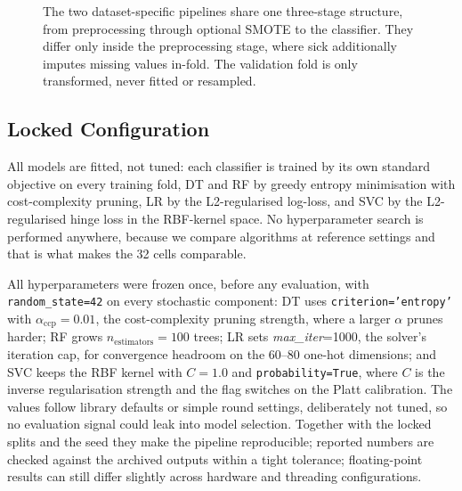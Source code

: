 \begin{figure}[H]
\caption{The two dataset-specific pipelines share one three-stage
structure, from preprocessing through optional SMOTE to the
classifier. They differ only inside the preprocessing stage, where
sick additionally imputes missing values in-fold. The validation fold
is only transformed, never fitted or resampled.}
\label{fig:pipelines}
\end{figure}

\subsection{Locked Configuration}
All models are fitted, not tuned: each classifier is trained by its
own standard objective on every training fold, DT and RF by greedy
entropy minimisation with cost-complexity pruning, LR by the
L2-regularised log-loss, and SVC by the L2-regularised hinge loss in
the RBF-kernel space. No hyperparameter search is performed anywhere,
because we compare algorithms at reference settings and that is what
makes the 32 cells comparable.

All hyperparameters were frozen once, before any evaluation, with
\texttt{random\_state=42} on every stochastic component:
DT uses \texttt{criterion='entropy'} with $\alpha_{\text{ccp}}=0.01$,
the cost-complexity pruning strength, where a larger $\alpha$ prunes
harder; RF grows $n_{\text{estimators}}=100$ trees; LR sets
\textit{max\_iter}=1000, the solver's iteration cap, for convergence
headroom on the 60--80 one-hot dimensions; and SVC keeps the RBF
kernel with $C=1.0$ and \texttt{probability=True}, where $C$ is the
inverse regularisation strength and the flag switches on the Platt
calibration.
The values follow library defaults or simple round settings,
deliberately not tuned, so no evaluation signal could leak into model
selection. Together with the locked splits and the seed they make the
pipeline reproducible; reported numbers are checked against the
archived outputs within a tight tolerance; floating-point results can still differ slightly across hardware and threading configurations.

